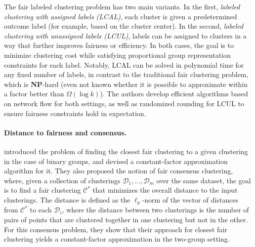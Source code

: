 The fair labeled clustering problem has two main variants. In the first, \emph{labeled clustering with assigned labels (LCAL)}, each cluster is given a predetermined outcome label (for example, based on the cluster center). In the second, \emph{labeled clustering with unassigned labels (LCUL)}, labels can be assigned to clusters in a way that further improves fairness or efficiency. In both cases, the goal is to minimize clustering cost while satisfying proportional group representation constraints for each label. Notably, LCAL can be solved in polynomial time for any fixed number of labels, in contrast to the traditional fair clustering problem, which is {\bf NP}-hard (even not known whether it is possible to approximate within a factor better than $\Omega(\log k)$). The authors develop efficient algorithms based on network flow for both settings, as well as randomized rounding for LCUL to ensure fairness constraints hold in expectation.


\paragraph{Distance to fairness and consensus.} \citet{chakraborty2025towards} introduced the problem of finding the closest fair clustering to a given clustering in the case of binary groups, and devised a constant-factor approximation algorithm for it. They also proposed the notion of fair consensus clustering, where, given a collection of clusterings $\mathcal{D}_1, \ldots, \mathcal{D}_m$ over the same dataset, the goal is to find a fair clustering $\mathcal{C}^*$ that minimizes the overall distance to the input clusterings. The distance is defined as the $\ell_p$-norm of the vector of distances from $\mathcal{C}^*$ to each $\mathcal{D}_i$, where the distance between two clusterings is the number of pairs of points that are clustered together in one clustering but not in the other. For this consensus problem, they show that their approach for closest fair clustering yields a constant-factor approximation in the two-group setting.  

